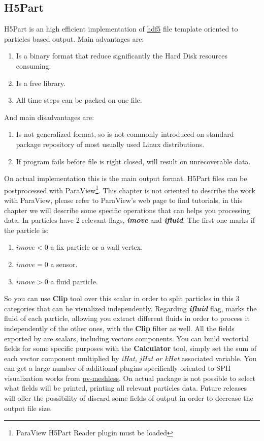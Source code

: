 \subsection{H5Part}
\label{sss:visualizationoutput:H5Part}
%
H5Part is an high efficient implementation of \href{http://www.hdfgroup.org/HDF5}{hdf5}
file template oriented to particles based output. Main advantages are:
%
\begin{enumerate}
	\item Is a binary format that reduce significantly the Hard Disk resources consuming.
	\item Is a free library.
	\item All time steps can be packed on one file.
\end{enumerate}
%
And main disadvantages are:
%
\begin{enumerate}
	\item Is not generalized format, so is not commonly introduced on standard package repository
	of most usually used Linux distributions.
	\item If program fails before file is right closed, will result on unrecoverable data.
\end{enumerate}
%
On actual \NAME implementation this is the main output format. H5Part files can be postprocessed
with ParaView\footnote{ParaView H5Part Reader plugin must be loaded}. This chapter is not
oriented to describe the work with ParaView, please refer to ParaView's web page to find tutorials,
in this chapter we will describe some specific operations that can helps you processing data.\rc
%
In \NAME particles have 2 relevant flags, \textit{\textbf{imove}} and \textit{\textbf{ifluid}}. The
first one marks if the particle is:
%
\begin{enumerate}
	\item $imove < 0$ a fix particle or a wall vertex.
	\item $imove = 0$ a sensor.
	\item $imove > 0$ a fluid particle.
\end{enumerate}
%
So you can use \textbf{Clip} tool over this scalar in order to split particles in this 3 categories
that can be visualized independently. Regarding \textit{\textbf{ifluid}} flag, marks the fluid of
each particle, allowing you extract different fluids in order to process it independently of the 
other ones, with the \textbf{Clip} filter as well.\rc
%
All the fields exported by \NAME are scalars, including vectors components. You can build vectorial
fields for some specific purposes with the \textbf{Calculator} tool, simply set the sum of each
vector component multiplied by \textit{iHat, jHat or kHat} associated variable.\rc
%
You can get a large number of additional plugins specifically oriented to SPH visualization works
from
\href{https://hpcforge.org/plugins/mediawiki/wiki/pv-meshless/index.php/Main_Page_for_pv-meshless_WIKI}{pv-meshless}.\rc
%
On actual \NAME package is not possible to select what fields will be printed, printing all relevant
particles data. Future releases will offer the possibility of discard some fields of output in order
to decrease the output file size.
%
